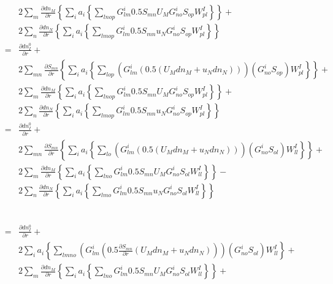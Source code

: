 \documentclass{article}
\begin{document}
\begin{eqnarray*}
&&   2 \sum_{m} \frac{\partial dn_M}{\partial r} \left\{ \sum_i a_i \left\{ \sum_{lnop} G^i_{lm} 0.5 S_{mn} U_M G^i_{no} S_{op} W^I_{pl} \right\}\right\} + \\
&&   2 \sum_{n} \frac{\partial dn_N}{\partial r} \left\{ \sum_i a_i \left\{ \sum_{lmop} G^i_{lm} 0.5 S_{mn} u_N G^i_{no} S_{op} W^I_{pl} \right\} \right\} \\
   & = & \frac{\partial dn^0_I}{\partial r} + \\
&&   2 \sum_{mn} \frac{\partial S_{mn}}{\partial r} \left\{ \sum_i a_i \left\{ \sum_{lop} \left(G^i_{lm} \left( 0.5 (U_M dn_M + u_N dn_N)\right)\right) \left( G^i_{no} S_{op} \right) W^I_{pl} \right\} \right\} + \\
&&   2 \sum_{m} \frac{\partial dn_M}{\partial r} \left\{ \sum_i a_i \left\{ \sum_{lnop} G^i_{lm} 0.5 S_{mn} U_M G^i_{no} S_{op} W^I_{pl} \right\}\right\} + \\
&&   2 \sum_{n} \frac{\partial dn_N}{\partial r} \left\{ \sum_i a_i \left\{ \sum_{lmop} G^i_{lm} 0.5 S_{mn} u_N G^i_{no} S_{op} W^I_{pl} \right\} \right\} \\
   & = & \frac{\partial dn^0_I}{\partial r} + \\
&&   2 \sum_{mn} \frac{\partial S_{mn}}{\partial r} \left\{ \sum_i a_i \left\{ \sum_{lo} \left(G^i_{lm} \left( 0.5 (U_M dn_M + u_N dn_N)\right)\right) \left( G^i_{no} S_{ol} \right) W^I_{ll} \right\} \right\} + \\
&&   2 \sum_{m} \frac{\partial dn_M}{\partial r} \left\{ \sum_i a_i \left\{ \sum_{lno} G^i_{lm} 0.5 S_{mn} U_M G^i_{no} S_{ol} W^I_{ll} \right\}\right\} - \\
&&   2 \sum_{n} \frac{\partial dn_N}{\partial r} \left\{ \sum_i a_i \left\{ \sum_{lmo} G^i_{lm} 0.5 S_{mn} u_N G^i_{no} S_{ol} W^I_{ll} \right\} \right\} \\
&& \\
&& \\
&& \\
&& \\
&& \\
&& \\
   & = & \frac{\partial dn^0_I}{\partial r} + \\
&&   2 \sum_i a_i \left\{ \sum_{lmno} \left(G^i_{lm} \left( 0.5 \frac{\partial S_{mn}}{\partial r} (U_M dn_M + u_N dn_N)\right)\right) \left( G^i_{no} S_{ol} \right) W^I_{ll} \right\} + \\
&&   2 \sum_{m} \frac{\partial dn_M}{\partial r} \left\{ \sum_i a_i \left\{ \sum_{lno} G^i_{lm} 0.5 S_{mn} U_M G^i_{no} S_{ol} W^I_{ll} \right\}\right\} + \\

\end{eqnarray*}
\end{document}

